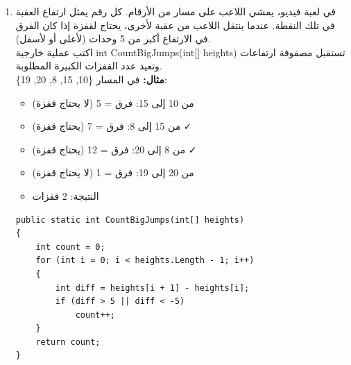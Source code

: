 \documentclass[14pt]{extarticle}
\begin{document}
\begin{enumerate}[resume, itemsep=2em]
    \item
    في لعبة فيديو، يمشي اللاعب على مسار من الأرقام. كل رقم يمثل ارتفاع العقبة في تلك النقطة. عندما ينتقل اللاعب من عقبة لأخرى، يحتاج لقفزة إذا كان الفرق في الارتفاع أكبر من 5 وحدات (لأعلى أو لأسفل).\\
    اكتب عملية خارجية \textenglish{int CountBigJumps(int[] heights)} تستقبل مصفوفة ارتفاعات وتعيد عدد القفزات الكبيرة المطلوبة.\\
    \textbf{مثال:} في المسار \textenglish{\{10, 15, 8, 20, 19\}}:
    \begin{itemize}
        \item من 10 إلى 15: فرق = 5 (لا يحتاج قفزة)
        \item من 15 إلى 8: فرق = 7 (يحتاج قفزة) ✓
        \item من 8 إلى 20: فرق = 12 (يحتاج قفزة) ✓
        \item من 20 إلى 19: فرق = 1 (لا يحتاج قفزة)
        \item النتيجة: 2 قفزات
    \end{itemize}
    \ifwithsols
    \begin{boxSolution}
    \begin{english}
    \begin{verbatim}
public static int CountBigJumps(int[] heights)
{
    int count = 0;
    for (int i = 0; i < heights.Length - 1; i++)
    {
        int diff = heights[i + 1] - heights[i];
        if (diff > 5 || diff < -5)
            count++;
    }
    return count;
}
    \end{verbatim}
    \end{english}
    \end{boxSolution}
    \fi


\end{enumerate}
\end{document}
